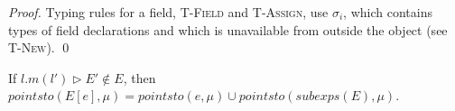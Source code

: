 \documentclass{llncs}
\newcommand{\keywadj}[1]{\mathtt{#1}}
\newcommand{\keyw}[1]{\keywadj{#1}~}
\begin{document}
\begin{proof}
Typing rules for a field, \textsc{T-Field} and \textsc{T-Assign}, use $\sigma_i$, which contains types of field declarations and which is unavailable from outside the object (see \textsc{T-New}). \qed
\end{proof}

%
%
%
%
%          
%
%


\newpage

\begin{mdframed}
\begin{lemma}
\label{l:ses-e}
If $l.m(l') \rhd E' \not\in E$, then $pointsto(E[e], \mu) = pointsto(e, \mu) \cup pointsto(subexps(E), \mu)$.
\end{lemma}
\end{mdframed}
\end{document}
